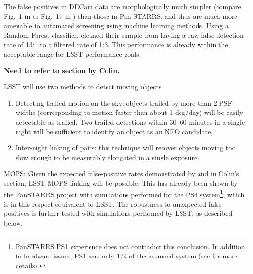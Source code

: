 The false positives in DECam data are morphologically much simpler
(compare Fig.~1 in \citep{goldstein15} to Fig.~17 in \citep{denneau13})
than those in Pan-STARRS, and thus are much more amenable to automated 
screening using machine learning methods. Using a Random Forest 
classifier, \cite{goldstein15} cleaned their sample from having a 
raw false detection rate of 13:1 to a filtered rate of 1:3. This performance
is already within the acceptable range for LSST performance goals. 


{\bf Need to refer to section by Colin.} 

LSST will use two methods to detect moving objects
\begin{enumerate}
\item Detecting trailed motion on the sky:  objects trailed by more
  than 2 PSF widths (corresponding to motion faster than about 1
  deg/day) will be easily detectable as trailed.  Two trailed
  detections within 30--60 minutes in a single night will be
  sufficient to identify an object as an NEO candidate,
\item Inter-night linking of pairs: this technique will recover
  objects moving too slow enough to be measurably elongated in 
  a single exposure. 
\end{enumerate} 

MOPS: Given the expected false-positive rates demonstrated by
\cite{goldstein15} and in Colin's  section, LSST MOPS linking will
be possible. This has already been shown by the PanSTARRS project 
with simulations performed for the PS4 system\footnote{PanSTARRS 
PS1 experience does not contradict this conclusion. In addition to 
hardware issues, PS1 was only 1/4 of the assumed system (see 
\citep{denneau13} for more details). }, which is in this
respect equivalent to LSST. The robustness to unexpected false
positives is further tested with simulations performed by LSST,
as described below. 
   



